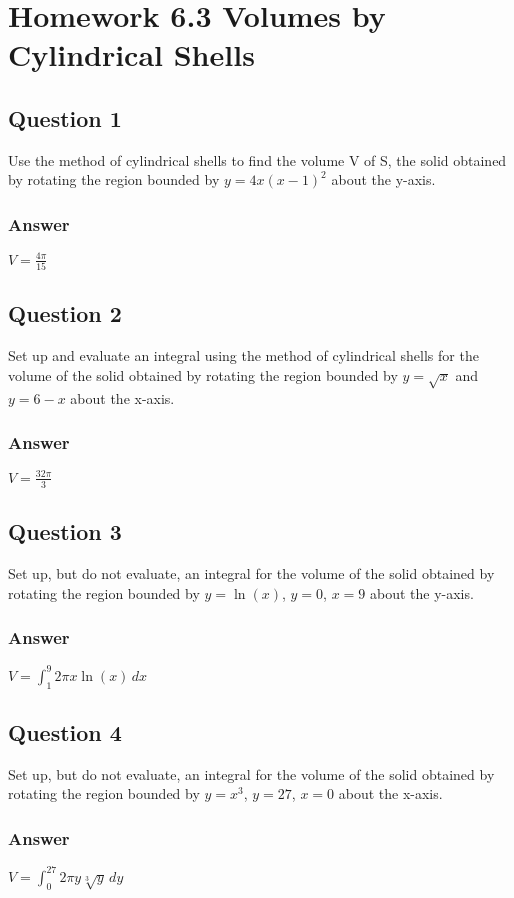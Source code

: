 \documentclass{article}
\begin{document}
\newpage
\section{Homework 6.3 Volumes by Cylindrical Shells}

\subsection*{Question 1}
Use the method of cylindrical shells to find the volume V of S, the solid obtained by rotating the region bounded by $y=4x(x-1)^2$ about the y-axis.
\subsubsection*{Answer}
$ V = \frac{4\pi}{15} $

\subsection*{Question 2}
Set up and evaluate an integral using the method of cylindrical shells for the volume of the solid obtained by rotating the region bounded by $y=\sqrt{x}$ and $y=6-x$ about the x-axis.
\subsubsection*{Answer}
$ V = \frac{32\pi}{3} $

\subsection*{Question 3}
Set up, but do not evaluate, an integral for the volume of the solid obtained by rotating the region bounded by $y=\ln(x)$, $y=0$, $x=9$ about the y-axis.
\subsubsection*{Answer}
$ V = \int_1^9 2\pi x \ln(x) \,dx $

\subsection*{Question 4}
Set up, but do not evaluate, an integral for the volume of the solid obtained by rotating the region bounded by $y=x^3$, $y=27$, $x=0$ about the x-axis.
\subsubsection*{Answer}
$ V = \int_0^{27} 2\pi y \sqrt[3]{y} \,dy $
\end{document}
